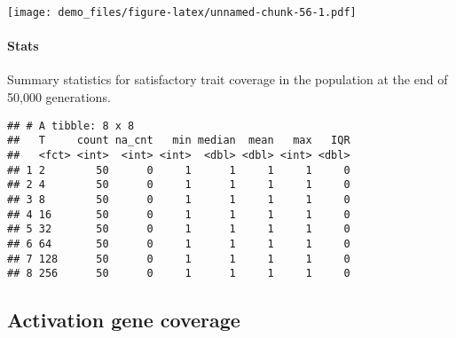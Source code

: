 \documentclass[]{book}
\newenvironment{Shaded}{\begin{snugshade}}{\end{snugshade}}
\newcommand{\DataTypeTok}[1]{\textcolor[rgb]{0.13,0.29,0.53}{#1}}
\newcommand{\KeywordTok}[1]{\textcolor[rgb]{0.13,0.29,0.53}{\textbf{#1}}}
\newcommand{\NormalTok}[1]{#1}
\newcommand{\OperatorTok}[1]{\textcolor[rgb]{0.81,0.36,0.00}{\textbf{#1}}}
\newcommand{\OtherTok}[1]{\textcolor[rgb]{0.56,0.35,0.01}{#1}}
\newcommand{\StringTok}[1]{\textcolor[rgb]{0.31,0.60,0.02}{#1}}
\let\oldparagraph\paragraph
\renewcommand{\paragraph}[1]{\oldparagraph{#1}\mbox{}}
\begin{document}
\texttt{[image: demo\_files/figure-latex/unnamed-chunk-56-1.pdf]}

\hypertarget{stats-32}{%
\paragraph{Stats}\label{stats-32}}

Summary statistics for satisfactory trait coverage in the population at the end of 50,000 generations.

\begin{Shaded}
\end{Shaded}

\begin{verbatim}
## # A tibble: 8 x 8
##   T     count na_cnt   min median  mean   max   IQR
##   <fct> <int>  <int> <int>  <dbl> <dbl> <int> <dbl>
## 1 2        50      0     1      1     1     1     0
## 2 4        50      0     1      1     1     1     0
## 3 8        50      0     1      1     1     1     0
## 4 16       50      0     1      1     1     1     0
## 5 32       50      0     1      1     1     1     0
## 6 64       50      0     1      1     1     1     0
## 7 128      50      0     1      1     1     1     0
## 8 256      50      0     1      1     1     1     0
\end{verbatim}

\hypertarget{activation-gene-coverage-4}{%
\subsection{Activation gene coverage}\label{activation-gene-coverage-4}}
\end{document}
